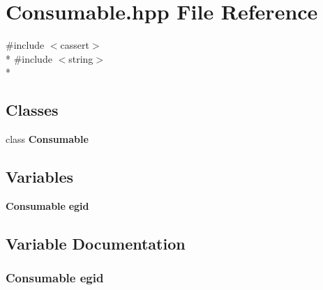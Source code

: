 \section{Consumable.\-hpp File Reference}
\label{_consumable_8hpp}
{\ttfamily \#include $<$cassert$>$}\\*
{\ttfamily \#include $<$string$>$}\\*
\subsection*{Classes}
\begin{DoxyCompactItemize}
\item 
class {\bf Consumable}
\end{DoxyCompactItemize}
\subsection*{Variables}
\begin{DoxyCompactItemize}
\item 
{\bf Consumable} {\bf egid}
\end{DoxyCompactItemize}


\subsection{Variable Documentation}
\subsubsection[{egid}]{\setlength{\rightskip}{0pt plus 5cm} {\bf Consumable}
     egid}\label{_consumable_8hpp_a958edca3d71b2f64f9cc767b7b57613f}
